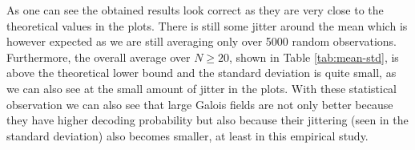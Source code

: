 \documentclass[a4paper,english,10pt]{tumarticle}
\begin{document}
As one can see the obtained results look correct as they are very close to the theoretical values in the plots. There is still some jitter around the mean which is however expected as we are still averaging only over 5000 random observations. Furthermore, the overall average over $N\ge20$, shown in Table \ref{tab:mean-std}, is above the theoretical lower bound and the standard deviation is quite small, as we can also see at the small amount of jitter in the plots. With these statistical observation we can also see that large Galois fields are not only better because they have higher decoding probability but also because their jittering (seen in the standard deviation) also becomes smaller, at least in this empirical study.











\end{document}
